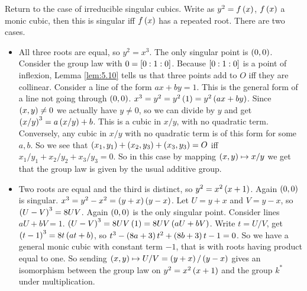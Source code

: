 Return to the case of irreducible singular cubics. Write as $ y^2 = f\rb{x} $, $ f\rb{x} $ a monic cubic, then this is singular iff $ f\rb{x} $ has a repeated root. There are two cases.
\begin{itemize}
\item All three roots are equal, so $ y^2 = x^3 $. The only singular point is $ \rb{0, 0} $. Consider the group law with $ 0 = \sb{0 : 1 : 0} $. Because $ \sb{0 : 1 : 0} $ is a point of inflexion, Lemma \ref{lem:5.10} tells us that three points add to $ O $ iff they are collinear. Consider a line of the form $ ax + by = 1 $. This is the general form of a line not going through $ \rb{0, 0} $. $ x^3 = y^2 = y^2\rb{1} = y^2\rb{ax + by} $. Since $ \rb{x, y} \ne 0 $ we actually have $ y \ne 0 $, so we can divide by $ y $ and get $ \rb{x / y}^3 = a\rb{x / y} + b $. This is a cubic in $ x / y $, with no quadratic term. Conversely, any cubic in $ x / y $ with no quadratic term is of this form for some $ a, b $. So we see that $ \rb{x_1, y_1} + \rb{x_2, y_3} + \rb{x_3, y_3} = O $ iff $ x_1 / y_1 + x_2 / y_2 + x_3 / y_3 = 0 $. So in this case by mapping $ \rb{x, y} \mapsto x / y $ we get that the group law is given by the usual additive group.

\pagebreak

\item Two roots are equal and the third is distinct, so $ y^2 = x^2\rb{x + 1} $. Again $ \rb{0, 0} $ is singular. $ x^3 = y^2 - x^2 = \rb{y + x}\rb{y - x} $. Let $ U = y + x $ and $ V = y - x $, so $ \rb{U - V}^3 = 8UV $. Again $ \rb{0, 0} $ is the only singular point. Consider lines $ aU + bV = 1 $. $ \rb{U - V}^3 = 8UV\rb{1} = 8UV\rb{aU + bV} $. Write $ t = U / V $, get $ \rb{t - 1}^3 = 8t\rb{at + b} $, so $ t^3 - \rb{8a + 3}t^2 + \rb{8b + 3}t - 1 = 0 $. So we have a general monic cubic with constant term $ -1 $, that is with roots having product equal to one. So sending $ \rb{x, y} \mapsto U / V = \rb{y + x} / \rb{y - x} $ gives an isomorphism between the group law on $ y^2 = x^2\rb{x + 1} $ and the group $ k^* $ under multiplication.
\end{itemize}


